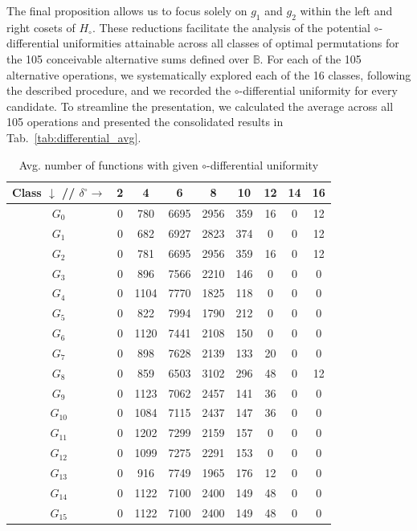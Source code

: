 \documentclass[runningheads,a4paper,english]{llncs}
\begin{document}
The final proposition allows us to focus solely on $g_1$ and $g_2$ within the left and right cosets of $H_\circ$. These reductions facilitate the analysis of the potential $\circ$-differential uniformities attainable across all classes of optimal permutations for the 105 conceivable alternative sums defined over $\mathbb B$.
For each of the 105 alternative operations, we systematically explored each of the 16 classes, following the described procedure, and we recorded the $\circ$-differential uniformity for every candidate. To streamline the presentation, we calculated the average across all 105 operations and presented the consolidated results in Tab.~\ref{tab:differential_avg}.


\begin{table}[h!]\label{tab:differential_avg}
	\centering
	\caption{Avg. number of functions with given $\circ$-differential uniformity}
	\label{tbl:10}
		{\footnotesize\begin{tabular}{c||c|c|c|c|c|c|c|c|}
		 Class $\downarrow$ // $\delta^\circ \rightarrow$& 2 & 4    & 6    & 8    & 10  & 12 & 14 & 16 \\ \hline\hline
		$G_0$    & 0& 780& 6695& 2956& 359& 16& 0& 12   \\
		$G_1$    & 0& 682& 6927& 2823& 374& 0& 0& 12 \\
		$G_2$    & 0& 781& 6695& 2956& 359& 16& 0& 12  \\
		$G_3$    & 0& 896& 7566& 2210& 146& 0& 0& 0  \\
		$G_4$    & 0& 1104& 7770& 1825& 118& 0& 0& 0   \\
		$G_5$    & 0& 822& 7994& 1790& 212& 0& 0& 0  \\
		$G_6$    & 0& 1120& 7441& 2108& 150& 0& 0& 0 \\
		$G_7$    & 0& 898& 7628& 2139& 133& 20& 0& 0  \\
		$G_8$    & 0& 859& 6503& 3102& 296& 48& 0& 12 \\
		$G_9$    & 0& 1123& 7062& 2457& 141& 36& 0& 0  \\
		$G_{10}$ & 0& 1084& 7115& 2437& 147& 36& 0& 0 \\
		$G_{11}$ & 0& 1202& 7299& 2159& 157& 0& 0& 0  \\
		$G_{12}$ & 0& 1099& 7275& 2291& 153& 0& 0& 0  \\
		$G_{13}$ & 0& 916& 7749& 1965& 176& 12& 0& 0   \\
		$G_{14}$ & 0& 1122& 7100& 2400& 149& 48& 0& 0  \\
		$G_{15}$ & 0& 1122& 7100& 2400& 149& 48& 0& 0 \\
  \hline
	\end{tabular}}
\end{table}
\end{document}
